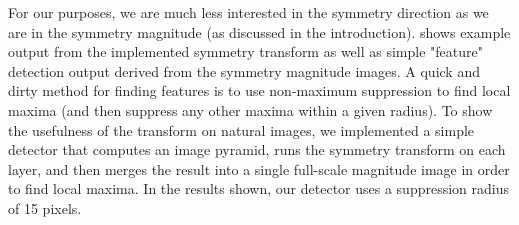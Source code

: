 For our purposes, we are much less interested in the symmetry direction as we are in the symmetry magnitude (as discussed in the introduction).  shows example output from the implemented symmetry transform as well as simple "feature" detection output derived from the symmetry magnitude images. A quick and dirty method for finding features is to use non-maximum suppression to find local maxima (and then suppress any other maxima within a given radius). To show the usefulness of the transform on natural images, we implemented a simple detector that computes an image pyramid, runs the symmetry transform on each layer, and then merges the result into a single full-scale magnitude image in order to find local maxima. In the results shown, our detector uses a suppression radius of 15 pixels. 

\Needspace{0.8\textheight}
